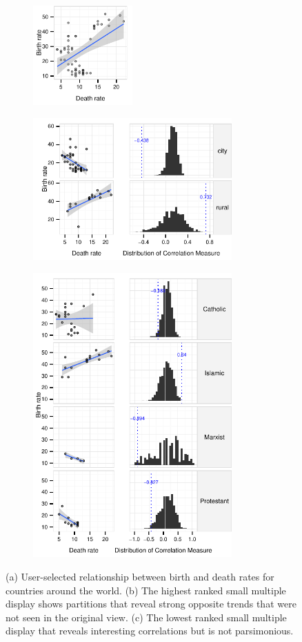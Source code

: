 \begin{figure}
 \centering 
	 \begin{subfigure}{1.5in}
		\includegraphics[width=1.5in]{images/DEATH_RT-BIRTH_RT.pdf}
		  \caption{}
		 \label{fig:informative_all}
	\end{subfigure}
	\begin{subfigure}{3in}
		\includegraphics[width=3in]{images/7_05653068514253-URBAN.pdf}
		 \label{fig:informative}
		  \caption{}
	 \end{subfigure}
	\begin{subfigure}{3in}
		\includegraphics[width=3in]{images/2_56911395752061-LEADER.pdf}
		  \caption{}
		 \label{fig:informative_sm_big}
	 \end{subfigure}
	  \caption{(a) User-selected relationship between birth and death rates for countries around the world. (b) The highest ranked small multiple display shows partitions that reveal strong opposite trends that were not seen in the original view. (c) The lowest ranked small multiple display that reveals interesting correlations but is not parsimonious.}
\end{figure}

